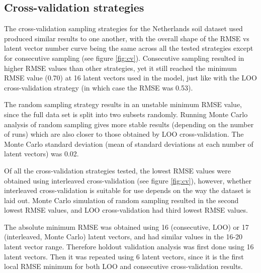 \documentclass{isprs}
\begin{document}
\subsection{Cross-validation strategies}\label{sec:Cross-validation strategies 2}

The cross-validation sampling strategies for the Netherlands soil dataset used produced similar results to one another, with the overall shape of the RMSE vs latent vector number curve being the same across all the tested strategies except for consecutive sampling (see figure \ref{fig:cv}). Consecutive sampling resulted in higher RMSE values than other strategies, yet it still reached the minimum RMSE value (0.70) at 16 latent vectors used in the model, just like with the LOO cross-validation strategy (in which case the RMSE was 0.53).

The random sampling strategy results in an unstable minimum RMSE value, since the full data set is split into two subsets randomly. Running Monte Carlo analysis of random sampling gives more stable results (depending on the number of runs) which are also closer to those obtained by LOO cross-validation. The Monte Carlo standard deviation (mean of standard deviations at each number of latent vectors) was 0.02.

Of all the cross-validation strategies tested, the lowest RMSE values were obtained using interleaved cross-validation (see figure \ref{fig:cv}), however, whether interleaved cross-validation is suitable for use depends on the way the dataset is laid out. Monte Carlo simulation of random sampling resulted in the second lowest RMSE values, and LOO cross-validation had third lowest RMSE values.

The absolute minimum RMSE was obtained using 16 (consecutive, LOO) or 17 (interleaved, Monte Carlo) latent vectors, and had similar values in the 16-20 latent vector range. Therefore holdout validation analysis was first done using 16 latent vectors. Then it was repeated using 6 latent vectors, since it is the first local RMSE minimum for both LOO and consecutive cross-validation results.
\end{document}
